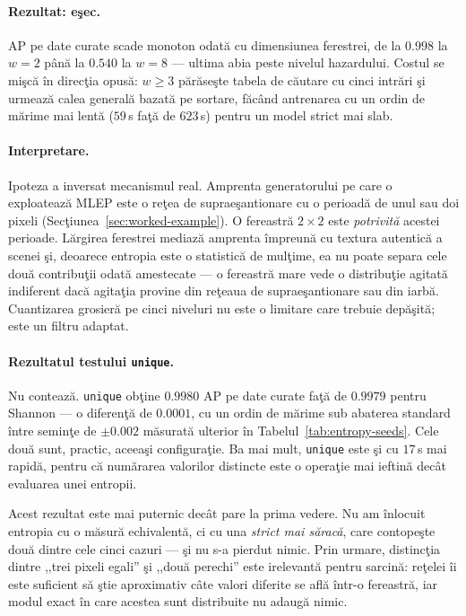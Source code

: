 \paragraph{Rezultat: eşec.} AP pe date curate scade monoton odată cu dimensiunea
ferestrei, de la $0.998$ la $w=2$ până la $0.540$ la $w=8$ --- ultima abia peste
nivelul hazardului. Costul se mişcă în direcţia opusă: $w \geq 3$ părăseşte
tabela de căutare cu cinci intrări şi urmează calea generală bazată pe sortare,
făcând antrenarea cu un ordin de mărime mai lentă ($59$\,s faţă de $623$\,s)
pentru un model strict mai slab.

\paragraph{Interpretare.} Ipoteza a inversat mecanismul real. Amprenta
generatorului pe care o exploatează MLEP este o reţea de supraeşantionare cu o
perioadă de unul sau doi pixeli (Secţiunea~\ref{sec:worked-example}). O fereastră
$2\times2$ este \emph{potrivită} acestei perioade. Lărgirea ferestrei mediază
amprenta împreună cu textura autentică a scenei şi, deoarece entropia este o
statistică de mulţime, ea nu poate separa cele două contribuţii odată amestecate
--- o fereastră mare vede o distribuţie agitată indiferent dacă agitaţia provine
din reţeaua de supraeşantionare sau din iarbă. Cuantizarea grosieră pe cinci
niveluri nu este o limitare care trebuie depăşită; este un filtru adaptat.

\paragraph{Rezultatul testului \texttt{unique}.} Nu contează. \texttt{unique}
obţine $0.9980$ AP pe date curate faţă de $0.9979$ pentru Shannon --- o diferenţă
de $0.0001$, cu un ordin de mărime sub abaterea standard între seminţe de
$\pm0.002$ măsurată ulterior în Tabelul~\ref{tab:entropy-seeds}. Cele două sunt,
practic, aceeaşi configuraţie. Ba mai mult, \texttt{unique} este şi cu
$17$\,s mai rapidă, pentru că numărarea valorilor distincte este o operaţie mai
ieftină decât evaluarea unei entropii.

Acest rezultat este mai puternic decât pare la prima vedere. Nu am înlocuit
entropia cu o măsură echivalentă, ci cu una \emph{strict mai săracă}, care
contopeşte două dintre cele cinci cazuri --- şi nu s-a pierdut nimic. Prin
urmare, distincţia dintre ,,trei pixeli egali'' şi ,,două perechi'' este
irelevantă pentru sarcină: reţelei îi este suficient să ştie aproximativ câte
valori diferite se află într-o fereastră, iar modul exact în care acestea sunt
distribuite nu adaugă nimic.

